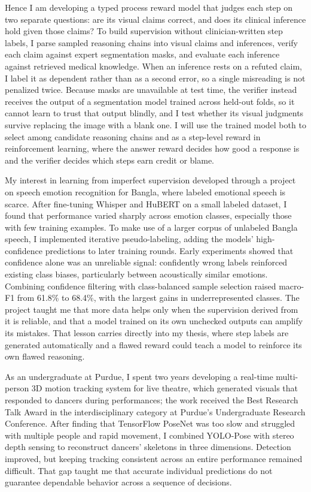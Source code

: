 \documentclass{article}
\begin{document}
Hence I am developing a typed process reward model that judges each step on two separate questions: are its visual claims correct, and does its clinical inference hold given those claims? To build supervision without clinician-written step labels, I parse sampled reasoning chains into visual claims and inferences, verify each claim against expert segmentation masks, and evaluate each inference against retrieved medical knowledge. When an inference rests on a refuted claim, I label it as dependent rather than as a second error, so a single misreading is not penalized twice. Because masks are unavailable at test time, the verifier instead receives the output of a segmentation model trained across held-out folds, so it cannot learn to trust that output blindly, and I test whether its visual judgments survive replacing the image with a blank one. I will use the trained model both to select among candidate reasoning chains and as a step-level reward in reinforcement learning, where the answer reward decides how good a response is and the verifier decides which steps earn credit or blame.


My interest in learning from imperfect supervision developed through a project on speech emotion recognition for Bangla, where labeled emotional speech is scarce. After fine-tuning Whisper and HuBERT on a small labeled dataset, I found that performance varied sharply across emotion classes, especially those with few training examples. To make use of a larger corpus of unlabeled Bangla speech, I implemented iterative pseudo-labeling, adding the models’ high-confidence predictions to later training rounds. Early experiments showed that confidence alone was an unreliable signal: confidently wrong labels reinforced existing class biases, particularly between acoustically similar emotions. Combining confidence filtering with class-balanced sample selection raised macro-F1 from 61.8\% to 68.4\%, with the largest gains in underrepresented classes. The project taught me that more data helps only when the supervision derived from it is reliable, and that a model trained on its own unchecked outputs can amplify its mistakes. That lesson carries directly into my thesis, where step labels are generated automatically and a flawed reward could teach a model to reinforce its own flawed reasoning.


As an undergraduate at Purdue, I spent two years developing a real-time multi-person 3D motion tracking system for live theatre, which generated visuals that responded to dancers during performances; the work received the Best Research Talk Award in the interdisciplinary category at Purdue’s Undergraduate Research Conference. After finding that TensorFlow PoseNet was too slow and struggled with multiple people and rapid movement, I combined YOLO-Pose with stereo depth sensing to reconstruct dancers’ skeletons in three dimensions. Detection improved, but keeping tracking consistent across an entire performance remained difficult. That gap taught me that accurate individual predictions do not guarantee dependable behavior across a sequence of decisions.
\end{document}
